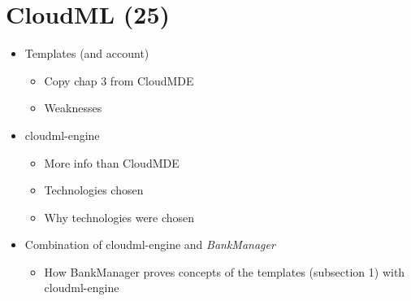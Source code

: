\section{CloudML (25)}

\begin{itemize}
  \item Templates (and account)
    \begin{itemize}
      \item Copy chap 3 from CloudMDE
      \item Weaknesses
    \end{itemize}
  \item cloudml-engine
    \begin{itemize}
      \item More info than CloudMDE
      \item Technologies chosen
      \item Why technologies were chosen
    \end{itemize}
  \item Combination of cloudml-engine and \emph{BankManager}
    \begin{itemize}
      \item How BankManager proves concepts of the templates (subsection 1) with cloudml-engine
    \end{itemize}
\end{itemize}
